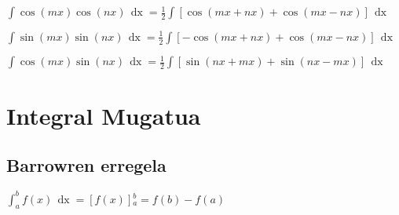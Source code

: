 \documentclass[8pt]{article}
\DeclareMathOperator{\xder}{\, \mathrm{d}x}
\begin{document}
		\subsubsection{}

			$ \int \cos (mx) \cos (nx) \xder = \frac{1}{2}
					\int [ \cos (mx + nx) + \cos (mx - nx) ] \xder $

			$ \int \sin (mx) \sin (nx) \xder = \frac{1}{2}
					\int [-\cos (mx + nx) + \cos (mx - nx) ] \xder $

			$ \int \cos (mx) \sin (nx) \xder = \frac{1}{2}
					\int [ \sin (nx + mx) + \sin (nx - mx) ] \xder $

\section{Integral Mugatua}
	\subsection{Barrowren erregela}
		$ \int_a^b f(x) \xder = [f(x)]{_a^b} = f(b) - f(a) $
\end{document}
